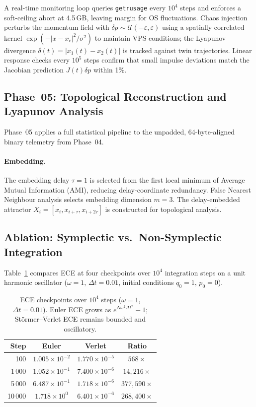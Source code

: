 \documentclass[10pt,twocolumn]{article}
\begin{document}
A real-time monitoring loop queries \texttt{getrusage}
every $10^4$ steps and enforces a soft-ceiling
abort at 4.5\,GB, leaving margin for OS fluctuations.
Chaos injection perturbs the momentum field with
$\delta p \sim \mathcal{U}(-\varepsilon,\varepsilon)$
using a spatially correlated kernel
$\exp(-|x-x_c|^2/\sigma^2)$ to maintain VPS conditions;
the Lyapunov divergence $\delta(t)=|x_1(t)-x_2(t)|$
is tracked against twin trajectories.
Linear response checks every $10^5$ steps confirm
that small impulse deviations match the Jacobian
prediction $J(t)\delta p$ within 1\%.

\subsection{Phase~05: Topological Reconstruction and Lyapunov Analysis}

Phase~05 applies a full statistical pipeline to the
unpadded, 64-byte-aligned binary telemetry from Phase~04.

\paragraph{Embedding.}
The embedding delay $\tau=1$ is selected from the first local minimum of
Average Mutual Information (AMI), reducing delay-coordinate redundancy.
False Nearest Neighbour analysis selects embedding dimension $m=3$.
The delay-embedded attractor $X_i = [x_i, x_{i+\tau}, x_{i+2\tau}]$
is constructed for topological analysis.

\subsection*{Ablation: Symplectic vs.\ Non-Symplectic Integration}
\label{sec:ablation}

Table~\ref{tab:ablation} compares ECE at four checkpoints over
$10^4$ integration steps on a unit harmonic oscillator
($\omega=1$, $\Delta t=0.01$, initial conditions $q_0=1$, $p_0=0$).

\begin{table}[h]
\centering
\caption{ECE checkpoints over $10^4$ steps ($\omega=1$,
         $\Delta t=0.01$). Euler ECE grows as
         $e^{N\omega^2\Delta t^2}-1$; St\"{o}rmer--Verlet ECE
         remains bounded and oscillatory.}
\label{tab:ablation}
\scriptsize
\begin{tabular}{@{}rccc@{}}
\toprule
\textbf{Step} & \textbf{Euler}
              & \textbf{Verlet}
              & \textbf{Ratio} \\
\midrule
100    & $1.005\times10^{-2}$ & $1.770\times10^{-5}$ & $568\times$ \\
1\,000 & $1.052\times10^{-1}$ & $7.400\times10^{-6}$ & $14{,}216\times$ \\
5\,000 & $6.487\times10^{-1}$ & $1.718\times10^{-6}$ & $377{,}590\times$ \\
10\,000& $1.718\times10^{0}$  & $6.401\times10^{-6}$ & $268{,}400\times$ \\
\bottomrule
\end{tabular}
\end{table}
\end{document}
